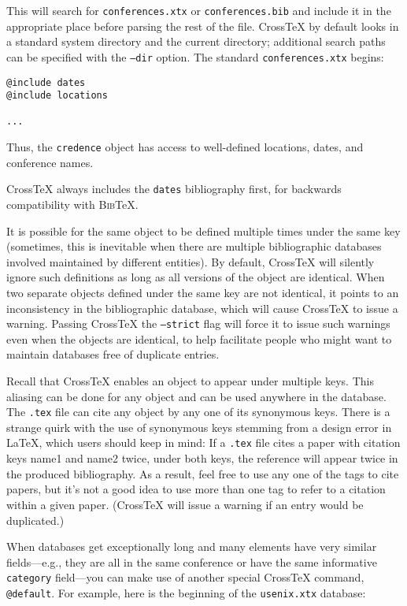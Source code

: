 \documentclass{article}
\newcommand{\XTeX}{Cross\TeX}
\newcommand{\BibTeX}{\textsc{Bib}\TeX}
\begin{document}
This will search for \texttt{conferences.xtx} or \texttt{conferences.bib} and include it in the appropriate place before parsing the rest of the file. \XTeX{} by default looks in a standard system directory and the current directory; additional search paths can be specified with the \texttt{--dir} option. The standard \texttt{conferences.xtx} begins:

\begin{small}\begin{verbatim}
@include dates
@include locations

...
\end{verbatim}\end{small}

Thus, the \texttt{credence} object has access to well-defined locations, dates, and conference names.

\XTeX{} always includes the \texttt{dates} bibliography first, for backwards compatibility with \BibTeX{}.

It is possible for the same object to be defined multiple times under the 
same key (sometimes, this is inevitable when there are multiple bibliographic
databases involved maintained by different entities). By default, \XTeX{}
will silently ignore such definitions as long as all versions of the object
are identical. When two separate objects defined under the same key are not
identical, it points to an inconsistency in the bibliographic database, which
will cause \XTeX{} to issue a warning. Passing \XTeX{} the \texttt{--strict} flag will force it to issue such warnings even when the objects are identical,
to help facilitate people who might want to maintain databases free of
duplicate entries.

Recall that \XTeX{} enables an object to appear under multiple keys. 
This aliasing can be done for any object and can be used anywhere in
the database. The \texttt{.tex} file can cite any object by any one of
its synonymous keys. There is a strange quirk with the use of
synonymous keys stemming from a design error in \LaTeX{}, which users
should keep in mind: If a \texttt{.tex} file cites a paper with
citation keys name1 and name2 twice, under both keys, the reference
will appear twice in the produced bibliography. As a result, feel free
to use any one of the tags to cite papers, but it's not a good idea to
use more than one tag to refer to a citation within a given paper.
(\XTeX{} will issue a warning if an entry would be duplicated.)

When databases get exceptionally long and many elements have very similar fields---e.g., they are all in the same conference or have the same informative \texttt{category} field---you can make use of another special \XTeX{} command, \texttt{@default}. For example, here is the beginning of the \texttt{usenix.xtx} database:
\end{document}

